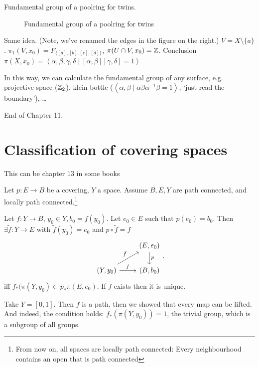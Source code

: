 \begin{eg}
    Fundamental group of a poolring for twins.
\begin{figure}[H]
    \centering
    \caption{Fundamental group of a poolring for twins}
    \label{fig:fundamental-group-of-a-poolring-for-twins}
\end{figure}

Same idea. (Note, we've renamed the edges in the figure on the right.)
$V = X \setminus \{ a\} $. $\pi_1(V, x_0) = F_{\{[a], [b], [c], [d]\}}$, $\pi(U \cap V, x_0) = \mathbb{Z}$.
Conclusion $\pi(X, x_0) = \left<\alpha, \beta, \gamma, \delta  \mid  [\alpha, \beta] [\gamma, \delta] = 1 \right>$

In this way, we can calculate the fundamental group of any surface,  e.g. projective space ($\mathbb{Z}_2$), klein bottle ($\left<\alpha, \beta  \mid \alpha\beta\alpha^{-1}\beta = 1 \right>$, `just read the boundary'), \ldots

\end{eg}

End of Chapter 11.




\setcounter{chapter}{11}
\chapter{Classification of covering spaces}

\begin{note}
    This can be chapter 13 in some books
\end{note}

\setcounter{section}{73}

\begin{lemma}
    Let $p: E \to B $ be a covering, $Y$ a space.
    Assume $B, E, Y$ are path connected, and locally path connected.\footnote{From now on, all spaces are locally path connected: Every neighbourhood contains an open that is path connected}

    Let $f: Y \to  B$, $y_0 \in Y, b_0  = f(y_0)$.
    Let $e_0 \in E$ such that $p(e_0) = b_0$.
    Then $\exists  \tilde{f}: Y \to  E$ with $\tilde{f}(y_0) = e_0$ and $p  \circ  \tilde{f} = f$
    \[
    \begin{tikzcd}
        & (E, e_0) \arrow[d, "p"]\\
        (Y, y_0) \arrow[r, "f"] \arrow[ur, "\tilde{f}"]&(B, b_0)
    \end{tikzcd}
    .\] 
    iff $f_*(\pi(Y, y_0) \subset p_* \pi(E, e_0)$.
    If $\tilde{f}$ exists then it is unique.
\end{lemma}
\begin{eg}
    Take $Y = [0, 1]$.
    Then $f$ is a path, then we showed that every map can be lifted. And indeed, the condition holds: $f_*(\pi(Y, y_0)) = 1$, the trivial group, which is a subgroup of all groups.
\end{eg}

